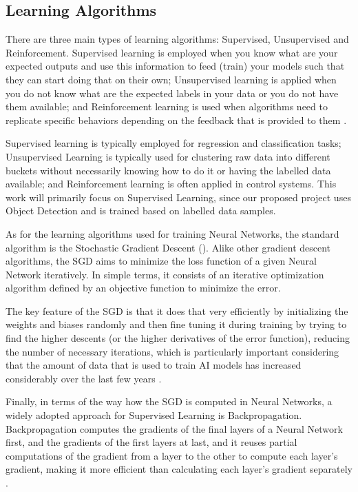 \documentclass[openright]{normas-utf-tex} %
\begin{document}
\subsection{Learning Algorithms}

There are three main types of learning algorithms: Supervised, Unsupervised and Reinforcement.
Supervised learning is employed when you know what are your expected outputs and use this
information to feed (train) your models such that they can start doing that on their own; 
Unsupervised learning is applied when you do not know what are the expected labels 
in your data or you do not have them available; and Reinforcement learning is used when
algorithms need to replicate specific behaviors depending on the feedback that is
provided to them \cite{CourseraML}. 

Supervised learning is typically employed for regression and classification tasks; 
Unsupervised Learning is typically used for clustering raw data into different buckets
without necessarily knowing how to do it or having the labelled data available;
and Reinforcement learning is often applied in control systems.
This work will primarily focus on Supervised Learning, since our proposed project uses
Object Detection and is trained based on labelled data samples.

As for the learning algorithms used for training Neural Networks, 
the standard algorithm is the Stochastic Gradient Descent ().
Alike other gradient descent algorithms, the SGD aims to minimize the loss function of a given
Neural Network iteratively. In simple terms, it consists of an iterative optimization algorithm defined by an
objective function to minimize the error.

The key feature of the SGD is that it does that very efficiently by initializing the weights
and biases randomly and then fine tuning it during training by trying to find the higher descents 
(or the higher derivatives of the error function), reducing the number of necessary iterations, 
which is particularly important considering that the amount of data that is used to train AI
models has increased considerably over the last few years \cite{CornellSGD}.

Finally, in terms of the way how the SGD is computed in Neural Networks, a widely adopted approach 
for Supervised Learning is Backpropagation. Backpropagation computes the gradients of the final 
layers of a Neural Network first, and the gradients of the first layers at last, 
and it reuses partial computations of the gradient from a layer to the other to compute each layer's 
gradient, making it more efficient than calculating each layer's gradient separately \cite{BrilliantBackpropagation}. 
\end{document}
